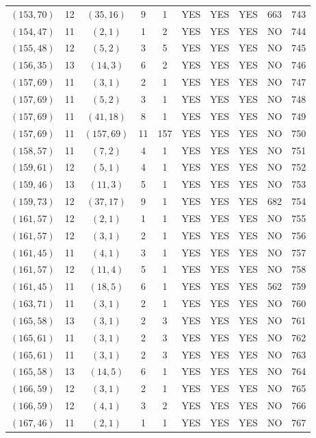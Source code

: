 \begin{longtable}{|c|c|c|c|c|c|c|c|c|c|}
$(153, 70)$ & 12 & $(35, 16)$ & 9 & 1 & YES & YES & YES & 663 & 743\\
$(154, 47)$ & 11 & $(2, 1)$ & 1 & 2 & YES & YES & YES & NO & 744\\
$(155, 48)$ & 12 & $(5, 2)$ & 3 & 5 & YES & YES & YES & NO & 745\\
$(156, 35)$ & 13 & $(14, 3)$ & 6 & 2 & YES & YES & YES & NO & 746\\
$(157, 69)$ & 11 & $(3, 1)$ & 2 & 1 & YES & YES & YES & NO & 747\\
$(157, 69)$ & 11 & $(5, 2)$ & 3 & 1 & YES & YES & YES & NO & 748\\
$(157, 69)$ & 11 & $(41, 18)$ & 8 & 1 & YES & YES & YES & NO & 749\\
$(157, 69)$ & 11 & $(157, 69)$ & 11 & 157 & YES & YES & YES & NO & 750\\
$(158, 57)$ & 11 & $(7, 2)$ & 4 & 1 & YES & YES & YES & NO & 751\\
$(159, 61)$ & 12 & $(5, 1)$ & 4 & 1 & YES & YES & YES & NO & 752\\
$(159, 46)$ & 13 & $(11, 3)$ & 5 & 1 & YES & YES & YES & NO & 753\\
$(159, 73)$ & 12 & $(37, 17)$ & 9 & 1 & YES & YES & YES & 682 & 754\\
$(161, 57)$ & 12 & $(2, 1)$ & 1 & 1 & YES & YES & YES & NO & 755\\
$(161, 57)$ & 12 & $(3, 1)$ & 2 & 1 & YES & YES & YES & NO & 756\\
$(161, 45)$ & 11 & $(4, 1)$ & 3 & 1 & YES & YES & YES & NO & 757\\
$(161, 57)$ & 12 & $(11, 4)$ & 5 & 1 & YES & YES & YES & NO & 758\\
$(161, 45)$ & 11 & $(18, 5)$ & 6 & 1 & YES & YES & YES & 562 & 759\\
$(163, 71)$ & 11 & $(3, 1)$ & 2 & 1 & YES & YES & YES & NO & 760\\
$(165, 58)$ & 13 & $(3, 1)$ & 2 & 3 & YES & YES & YES & NO & 761\\
$(165, 61)$ & 11 & $(3, 1)$ & 2 & 3 & YES & YES & YES & NO & 762\\
$(165, 61)$ & 11 & $(3, 1)$ & 2 & 3 & YES & YES & YES & NO & 763\\
$(165, 58)$ & 13 & $(14, 5)$ & 6 & 1 & YES & YES & YES & NO & 764\\
$(166, 59)$ & 12 & $(3, 1)$ & 2 & 1 & YES & YES & YES & NO & 765\\
$(166, 59)$ & 12 & $(4, 1)$ & 3 & 2 & YES & YES & YES & NO & 766\\
$(167, 46)$ & 11 & $(2, 1)$ & 1 & 1 & YES & YES & YES & NO & 767\\

\end{longtable}
